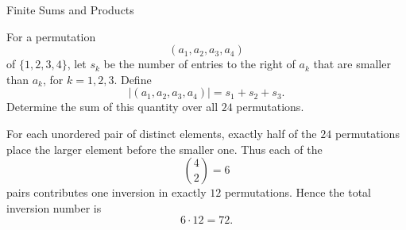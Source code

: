 \begin{expectedproblemgroup}{Finite Sums and Products}
        \begin{expectedsubproblem}[1997 CSAT]
            For a permutation
            \[
                (a_1,a_2,a_3,a_4)
            \]
            of $\{1,2,3,4\}$, let $s_k$ be the number of entries to the right
            of $a_k$ that are smaller than $a_k$, for $k=1,2,3$. Define
            \[
                |(a_1,a_2,a_3,a_4)|=s_1+s_2+s_3.
            \]
            Determine the sum of this quantity over all $24$ permutations.
        \end{expectedsubproblem}

        \begin{expectedsubsolution}
            For each unordered pair of distinct elements, exactly half of the
            $24$ permutations place the larger element before the smaller one.
            Thus each of the
            \[
                \binom42=6
            \]
            pairs contributes one inversion in exactly $12$ permutations. Hence
            the total inversion number is
            \[
                \boxed{6\cdot12=72}.
            \]
        \end{expectedsubsolution}

    \end{expectedproblemgroup}

